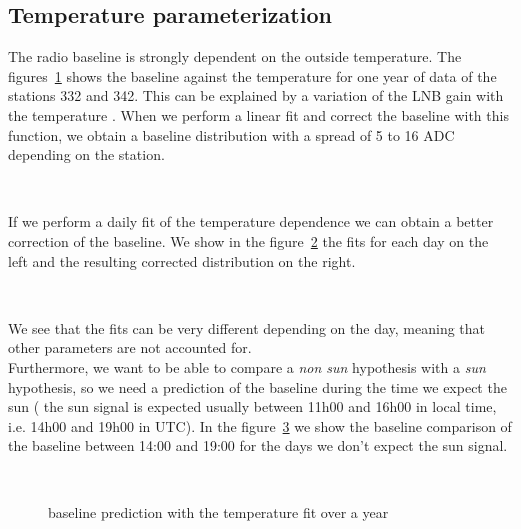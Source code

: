 \subsection{Temperature parameterization}
The   radio   baseline   is   strongly  dependent   on   the   outside
temperature. The figures~\ref{fig:ybltemp}  shows the baseline against
the temperature for one year of data of the stations 332 and 342. This
can be explained  by a variation of the LNB  gain with the temperature
\cite{PStempnote}.   When we  perform  a linear  fit  and correct  the
baseline with this function, we  obtain a baseline distribution with a
spread of 5 to 16 ADC depending on the station.
\begin{figure}[!ht]
  \centering
  \hspace*{-3ex}
  \\
  \caption{}
  \label{fig:ybltemp}
\end{figure}

If we perform a daily fit  of the temperature dependence we can obtain
a   better   correction   of   the   baseline.    We   show   in   the
figure~\ref{fig:dbltemp} the  fits for  each day on  the left  and the
resulting corrected distribution on the right. 
\begin{figure}[!ht]
  \centering
  \hspace*{-3ex}
  \\
  \caption{}
  \label{fig:dbltemp}
\end{figure}
We  see that  the fits  can be  very different  depending on  the day,
meaning that other parameters are not accounted for. \\Furthermore, we
want  to be  able  to compare  a  \textit{non sun}  hypothesis with  a
\textit{sun}  hypothesis, so  we  need a  prediction  of the  baseline
during the time we expect the sun ( the sun signal is expected usually
between  11h00 and  16h00  in local  time,  i.e.  14h00  and 19h00  in
UTC).  In  the   figure~\ref{fig:prediction1}  we  show  the  baseline
comparison of  the baseline  between 14:00 and  19:00 for the  days we
don't expect the sun  signal. 
\begin{figure}[!ht]
  \centering
  \hspace*{-3ex}
  \\
  \caption{baseline prediction with the temperature fit over a year}
  \label{fig:prediction1}
\end{figure}

